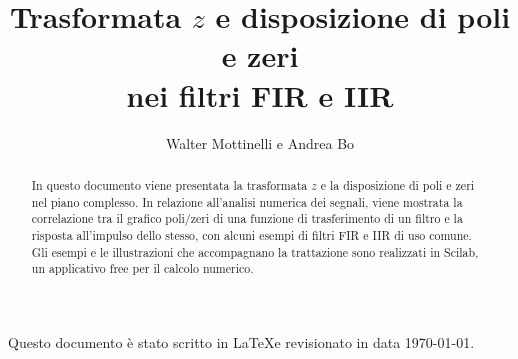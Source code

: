 \documentclass[a4paper,11pt]{report}
\author{Walter Mottinelli e Andrea Bo}
\title{Trasformata $z$ e disposizione di poli e zeri\\ nei filtri FIR e IIR}
\begin{document}
\maketitle
\tableofcontents
\begin{abstract}
In questo documento viene presentata la trasformata $z$ e la disposizione di poli e zeri nel piano complesso. In relazione all'analisi numerica dei segnali, viene mostrata la correlazione tra il grafico poli/zeri di una funzione di trasferimento di un filtro e la risposta all'impulso dello stesso, con alcuni esempi di filtri FIR e IIR di uso comune.\\
Gli esempi e le illustrazioni che accompagnano la trattazione sono realizzati in Scilab, un applicativo free per il calcolo numerico.
\end{abstract}
\newcommand{\Figdir}{images/}




\appendix



\newpage
Questo documento \`e stato scritto in \LaTeX e revisionato in data \today.
\end{document}
